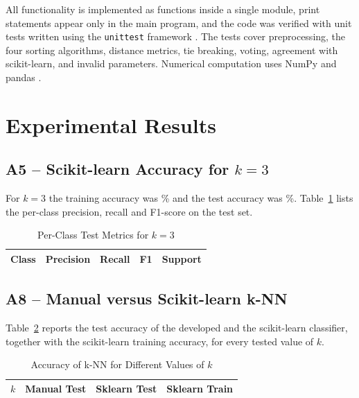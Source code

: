 \documentclass[conference]{IEEEtran}
\begin{document}
All functionality is implemented as functions inside a single module, print statements appear only in the main program, and the code was verified with unit tests written using the \texttt{unittest} framework \cite{unittest}. The tests cover preprocessing, the four sorting algorithms, distance metrics, tie breaking, voting, agreement with scikit-learn, and invalid parameters. Numerical computation uses NumPy \cite{numpy} and pandas \cite{pandas}.


\section{Experimental Results}

\subsection{A5 -- Scikit-learn Accuracy for $k=3$}

For $k=3$ the training accuracy was \trainAccThree\% and the test accuracy was \testAccThree\%. Table~\ref{tab:metrics} lists the per-class precision, recall and F1-score on the test set.

\begin{table}[h]
\centering
\caption{Per-Class Test Metrics for $k=3$}
\label{tab:metrics}

\begin{tabular}{|c|c|c|c|c|}

\hline

\textbf{Class} & \textbf{Precision} & \textbf{Recall} & \textbf{F1} & \textbf{Support}

\\ \hline



\end{tabular}

\end{table}

\subsection{A8 -- Manual versus Scikit-learn k-NN}

Table~\ref{tab:a8} reports the test accuracy of the developed and the scikit-learn classifier, together with the scikit-learn training accuracy, for every tested value of $k$.

\begin{table}[h]
\centering
\caption{Accuracy of k-NN for Different Values of $k$}
\label{tab:a8}

\begin{tabular}{|c|c|c|c|}

\hline

\textbf{$k$} & \textbf{Manual Test} & \textbf{Sklearn Test} & \textbf{Sklearn Train}

\\ \hline



\end{tabular}

\end{table}
\end{document}
